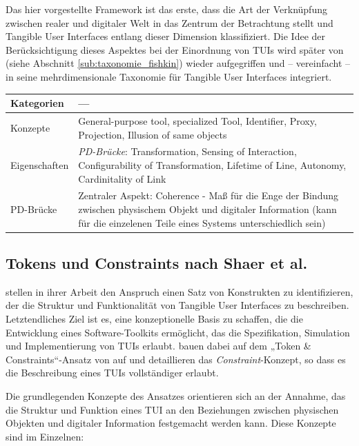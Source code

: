 Das hier vorgestellte Framework ist das erste, dass die Art der Verknüpfung zwischen realer und digitaler Welt in das Zentrum der Betrachtung stellt und Tangible User Interfaces entlang dieser Dimension klassifiziert. Die Idee der Berücksichtigung dieses Aspektes bei der Einordnung von \glspl{TUI} wird später von \citet{Fishkin04} (siehe Abschnitt \ref{sub:taxonomie_fishkin}) wieder aufgegriffen und -- vereinfacht -- in seine mehrdimensionale Taxonomie für Tangible User Interfaces integriert.

\begin{tabular}{| p{3cm} | p{10cm} |}
  \hline
  Kategorien & --- \\ \hline
  Konzepte & General-purpose tool, specialized Tool, Identifier, Proxy, Projection, Illusion of same objects \\ \hline
  Eigenschaften & \emph{PD-Brücke}: Transformation, Sensing of Interaction, Configurability of Transformation, Lifetime of Line, Autonomy, Cardinitality of Link \\ \hline
  PD-Brücke & Zentraler Aspekt: Coherence - Maß für die Enge der Bindung zwischen physischem Objekt und digitaler Information (kann für die einzelenen Teile eines Systems unterschiedlich sein) \\ \hline
\end{tabular} 


\subsection{Tokens und Constraints nach Shaer et al.} %
\label{sub:tokens_und_constraints_nach_shaer_et_al_}

\citet{Shaer04} stellen in ihrer Arbeit den Anspruch einen Satz von Konstrukten zu identifizieren, der die Struktur und Funktionalität von Tangible User Interfaces zu beschreiben. Letztendliches Ziel ist es, eine konzeptionelle Basis zu schaffen, die die Entwicklung eines Software-Toolkits ermöglicht, das die Spezifikation, Simulation und Implementierung von \glspl{TUI} erlaubt. \citet{Shaer04} bauen dabei auf dem „Token \& Constraints“-Ansatz von \citet{Ullmer02} auf und detaillieren das \emph{Constraint}-Konzept, so dass es die Beschreibung eines \glspl{TUI} vollständiger erlaubt. 

Die grundlegenden Konzepte des Ansatzes orientieren sich an der Annahme, das die Struktur und Funktion eines \gls{TUI} an den Beziehungen zwischen physischen Objekten und digitaler Information festgemacht werden kann. Diese Konzepte sind im Einzelnen:

